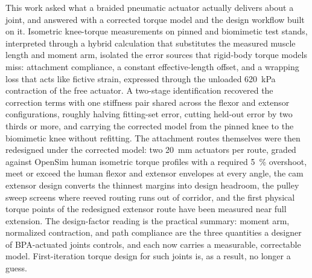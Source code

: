 This work asked what a braided pneumatic actuator actually delivers about a joint, and answered with a corrected torque model and the design workflow built on it. Isometric knee-torque measurements on pinned and biomimetic test stands, interpreted through a hybrid calculation that substitutes the measured muscle length and moment arm, isolated the error sources that rigid-body torque models miss: attachment compliance, a constant effective-length offset, and a wrapping loss that acts like fictive strain, expressed through the unloaded \qty{620}{\kPa} contraction of the free actuator. A two-stage identification recovered the correction terms with one stiffness pair shared across the flexor and extensor configurations, roughly halving fitting-set error, cutting held-out error by two thirds or more, and carrying the corrected model from the pinned knee to the biomimetic knee without refitting. The attachment routes themselves were then redesigned under the corrected model: two \diameter\qty{20}{\mm} actuators per route, graded against OpenSim human isometric torque profiles with a required \qty{5}{\percent} overshoot, meet or exceed the human flexor and extensor envelopes at every angle, the cam extensor design converts the thinnest margins into design headroom, the pulley sweep screens where reeved routing runs out of corridor, and the first physical torque points of the redesigned extensor route have been measured near full extension. The design-factor reading is the practical summary: moment arm, normalized contraction, and path compliance are the three quantities a designer of BPA-actuated joints controls, and each now carries a measurable, correctable model. First-iteration torque design for such joints is, as a result, no longer a guess.
